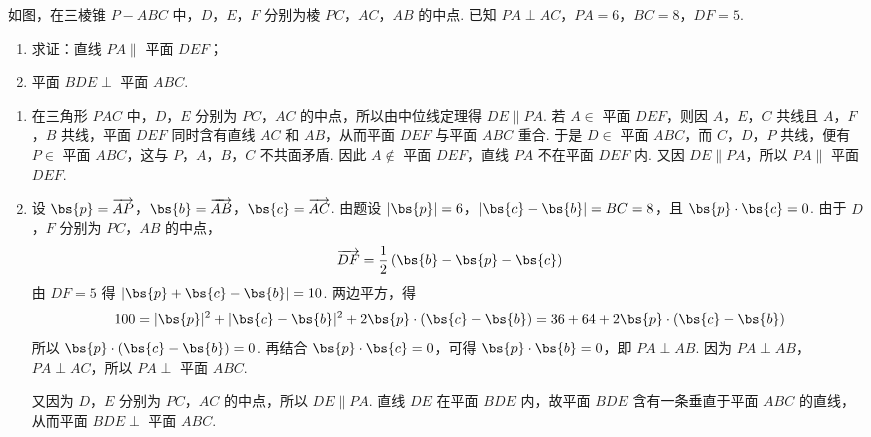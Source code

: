 \begin{problem}
如图，在三棱锥 \(P-ABC\) 中，\(D\)，\(E\)，\(F\) 分别为棱 \(PC\)，\(AC\)，\(AB\) 的中点. 已知 \(PA \perp AC\)，\(PA = 6\)，\(BC = 8\)，\(DF = 5\).

\begin{enumerate}
\item 求证：直线 \(PA \parallel\) 平面 \(DEF\)；
\item 平面 \(BDE \perp\) 平面 \(ABC\).
\end{enumerate}

\end{problem}

\begin{solution}
\begin{enumerate}
\item 在三角形 \(PAC\) 中，\(D\)，\(E\) 分别为 \(PC\)，\(AC\) 的中点，所以由中位线定理得 \(DE\parallel PA\). 若 \(A\in\) 平面 \(DEF\)，则因 \(A\)，\(E\)，\(C\) 共线且 \(A\)，\(F\)，\(B\) 共线，平面 \(DEF\) 同时含有直线 \(AC\) 和 \(AB\)，从而平面 \(DEF\) 与平面 \(ABC\) 重合. 于是 \(D\in\) 平面 \(ABC\)，而 \(C\)，\(D\)，\(P\) 共线，便有 \(P\in\) 平面 \(ABC\)，这与 \(P\)，\(A\)，\(B\)，\(C\) 不共面矛盾. 因此 \(A\notin\) 平面 \(DEF\)，直线 \(PA\) 不在平面 \(DEF\) 内. 又因 \(DE\parallel PA\)，所以 \(PA\parallel\) 平面 \(DEF\).

\item 设 \(\bs{p}=\overrightarrow{AP}\)，\(\bs{b}=\overrightarrow{AB}\)，\(\bs{c}=\overrightarrow{AC}\). 由题设 \(\lvert\bs{p}\rvert=6\)，\(\lvert\bs{c}-\bs{b}\rvert=BC=8\)，且 \(\bs{p}\cdot\bs{c}=0\).
由于 \(D\)，\(F\) 分别为 \(PC\)，\(AB\) 的中点，
\[
\overrightarrow{DF}=\frac12\left(\bs{b}-\bs{p}-\bs{c}\right)
\]
由 \(DF=5\) 得 \(\lvert\bs{p}+\bs{c}-\bs{b}\rvert=10\). 两边平方，得
\[
100=\lvert\bs{p}\rvert^2+\lvert\bs{c}-\bs{b}\rvert^2+2\bs{p}\cdot(\bs{c}-\bs{b})=36+64+2\bs{p}\cdot(\bs{c}-\bs{b})
\]
所以 \(\bs{p}\cdot(\bs{c}-\bs{b})=0\). 再结合 \(\bs{p}\cdot\bs{c}=0\)，可得 \(\bs{p}\cdot\bs{b}=0\)，即 \(PA\perp AB\). 因为 \(PA\perp AB\)，\(PA\perp AC\)，所以 \(PA\perp\) 平面 \(ABC\).

又因为 \(D\)，\(E\) 分别为 \(PC\)，\(AC\) 的中点，所以 \(DE\parallel PA\). 直线 \(DE\) 在平面 \(BDE\) 内，故平面 \(BDE\) 含有一条垂直于平面 \(ABC\) 的直线，从而平面 \(BDE\perp\) 平面 \(ABC\).
\end{enumerate}
\end{solution}

